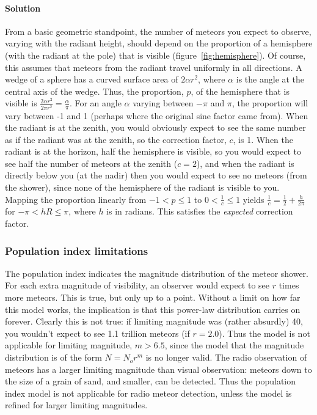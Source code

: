 \paragraph{Solution}
From a basic geometric standpoint, the number of meteors you expect to observe, varying with the radiant height, should depend on the proportion of a hemisphere (with the radiant at the pole) that is visible (figure~\ref{fig:hemisphere}). Of course, this assumes that meteors from the radiant travel uniformly in all directions. A wedge of a sphere has a curved surface area of $2{\alpha}r^2$, where $\alpha$ is the angle at the central axis of the wedge. Thus, the proportion, $p$, of the hemisphere that is visible is $\frac{2{\alpha}r^2}{2{\pi}r^2} = \frac{\alpha}{\pi}$. For an angle $\alpha$ varying between $-\pi$ and $\pi$, the proportion will vary between -1 and 1 (perhaps where the original sine factor came from). When the radiant is at the zenith, you would obviously expect to see the same number as if the radiant was at the zenith, so the correction factor, $c$, is 1. When the radiant is at the horizon, half the hemisphere is visible, so you would expect to see half the number of meteors at the zenith ($c = 2$), and when the radiant is directly below you (at the nadir) then you would expect to see no meteors (from the shower), since none of the hemisphere of the radiant is visible to you. Mapping the proportion linearly from $-1 < p \leq 1$ to $0 < \frac{1}{c} \leq 1$ yields $\frac{1}{c} = \frac{1}{2} + \frac{h}{2\pi}$ for $-\pi < hR \leq \pi$, where $h$ is in radians. This satisfies the \textit{expected} correction factor.

\subsubsection{Population index limitations}
The population index indicates the magnitude distribution of the meteor shower. For each extra magnitude of visibility, an observer would expect to see $r$ times more meteors. This is true, but only up to a point. Without a limit on how far this model works, the implication is that this power-law distribution carries on forever. Clearly this is not true: if limiting magnitude was (rather absurdly) 40, you wouldn't expect to see 1.1 trillion meteors (if $r=2.0$). Thus the model is not applicable for limiting magnitude, $m > 6.5$, since the model that the magnitude distribution is of the form $N = N_or^m$ is no longer valid. The radio observation of meteors has a larger limiting magnitude than visual observation: meteors down to the size of a grain of sand, and smaller, can be detected. Thus the population index model is not applicable for radio meteor detection, unless the model is refined for larger limiting magnitudes.

